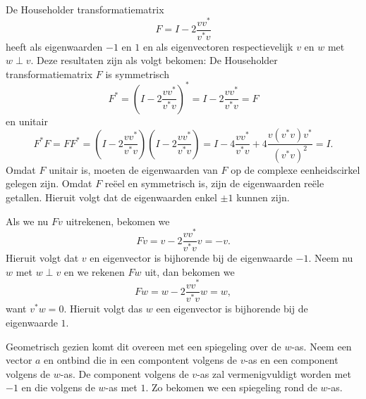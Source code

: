 De Householder transformatiematrix
$$F=I - 2\frac{vv^*}{v^*v}$$
heeft als eigenwaarden $-1$ en $1$ en als eigenvectoren respectievelijk $v$ en $w$ met $w \perp v$. Deze resultaten zijn als volgt bekomen:
De Householder transformatiematrix $F$ is symmetrisch 
$$F^* = (I - 2\frac{vv^*}{v^*v})^* = I - 2\frac{vv^*}{v^*v} = F$$
en unitair
$$F^*F = FF^* = (I - 2\frac{vv^*}{v^*v})(I - 2\frac{vv^*}{v^*v}) = I - 4\frac{vv^*}{v^*v} + 4\frac{v(v^*v)v^*}{(v^{*}v)^2} = I.$$
Omdat $F$ unitair is, moeten de eigenwaarden van $F$ op de complexe eenheidscirkel gelegen zijn.
Omdat $F$ re\"eel en symmetrisch is, zijn de eigenwaarden re\"ele getallen.
Hieruit volgt dat de eigenwaarden enkel $\pm 1$ kunnen zijn.

Als we nu $Fv$ uitrekenen, bekomen we
$$Fv = v - 2\frac{vv^*}{v^*v}v = -v.$$
Hieruit volgt dat $v$ en eigenvector is bijhorende bij de eigenwaarde $-1$.
Neem nu $w$ met $w \perp v$ en we rekenen $Fw$ uit, dan bekomen we
$$Fw = w - 2\frac{vv^*}{v^*v}w = w,$$
want $v^*w = 0$. Hieruit volgt das $w$ een eigenvector is bijhorende bij de eigenwaarde $1$.

Geometrisch gezien komt dit overeen met een spiegeling over de $w$-as. Neem een vector $a$ en ontbind die in een compontent volgens de $v$-as en een component volgens de $w$-as. De component volgens de $v$-as zal vermenigvuldigt worden met $-1$ en die volgens de $w$-as met $1$. Zo bekomen we een spiegeling rond de $w$-as.